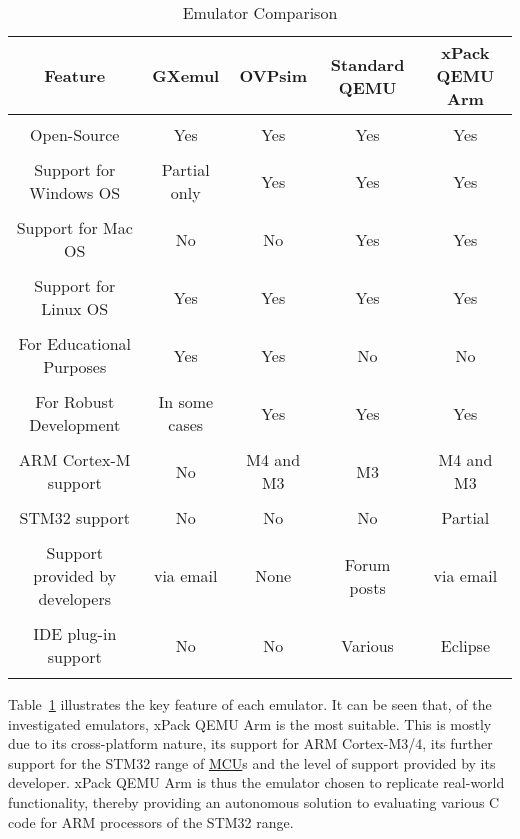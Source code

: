 \begin{center}
	\begin{table}[H]
	\centering
	\begin{adjustbox}{angle = 270}
    	\begin{tabular}{|c|c|c|c|c|}
   		\hline
   		Feature & GXemul & OVPsim & Standard QEMU & xPack QEMU Arm\\
    	\hline
    	&  &  &  & \\
    	Open-Source & Yes & Yes & Yes & Yes\\
    	&  &  &  & \\
    	Support for Windows OS & Partial only & Yes & Yes & Yes\\
    	&  &  &  & \\
    	Support for Mac OS & No & No & Yes & Yes\\ 
    	&  &  &  & \\
    	Support for Linux OS & Yes & Yes & Yes & Yes\\
    	&  &  &  & \\ 
    	For Educational Purposes & Yes & Yes & No & No\\ 
    	&  &  &  & \\
    	For Robust Development & In some cases & Yes & Yes & Yes\\
    	&  &  &  & \\
    	ARM Cortex-M support & No & M4 and M3 & M3 & M4 and M3\\
    	&  &  &  & \\ 
   		STM32 support & No & No & No & Partial\\
   		&  &  &  & \\
   		Support provided by developers & via email & None & 			Forum posts & via email\\
   		&  &  &  & \\
   		IDE plug-in support & No & No & Various & Eclipse\\
   		&  &  &  & \\
   		\hline
    	\end{tabular}
    	\end{adjustbox}
    	\caption{Emulator Comparison}
		\label{emComp}
	\end{table}
\end{center}

Table~\ref{emComp} illustrates the key feature of each emulator. It can be seen  that, of the investigated emulators, xPack QEMU Arm is the most suitable. This is mostly due to its cross-platform nature, its support for ARM Cortex-M3/4, its further support for the STM32 range of \hyperref[listAbr]{MCU}s and the level of support provided by its developer. xPack QEMU Arm is thus the emulator chosen to replicate real-world functionality, thereby providing an autonomous solution to evaluating various C code for ARM processors of the STM32 range.

